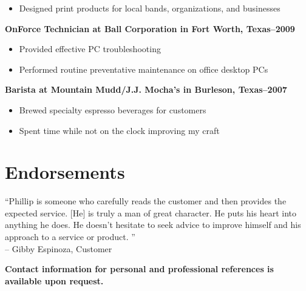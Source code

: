 \documentclass[margin]{res}
\newcommand{\sectionspace}{\vspace{10pt}}
\begin{document}
\begin{resume}
\begin{itemize}
                   \item Designed print products for local bands, organizations, and businesses
                 \end{itemize}
              
                \textbf{OnForce Technician
                 at Ball Corporation in Fort Worth, Texas--2009}
                 \vspace{-10pt}\begin{itemize} \itemsep -2pt %
                   \item Provided effective PC troubleshooting
                 
                   \item Performed routine preventative maintenance on office desktop PCs
                 \end{itemize}
              
                \textbf{Barista
                 at Mountain Mudd/J.J. Mocha's in Burleson, Texas--2007}
                 \vspace{-10pt}\begin{itemize} \itemsep -2pt %
                   \item Brewed specialty espresso beverages for customers
                 
                   \item Spent time while not on the clock improving my craft
                 \end{itemize}
              

\sectionspace


\section{
Endorsements}

              
                ``Phillip is someone who carefully reads the customer and then provides the
expected service. [He] is truly a man of great character. He puts his
heart into anything he does. He doesn't hesitate to seek advice to improve
himself and his approach to a service or product.
''                    \\
                -- Gibby Espinoza, Customer
              

\sectionspace


\sectionspace


\textbf{\footnotesize Contact information for personal and professional references is available upon request.}


\end{resume}
\end{document}
